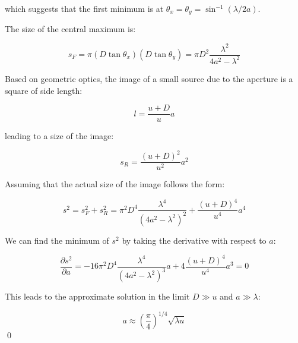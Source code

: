 \documentclass[12pt]{article}
\begin{document}
which suggests that the first minimum is at $\theta_{x} = \theta_{y} = \sin^{-1}{(\lambda/2a)}$.

The size of the central maximum is:

\begin{equation}
    s_{F} = \pi \left( D\tan{\theta_{x}} \right) \left( D\tan{\theta_{y}} \right) = \pi D^{2} \frac{\lambda^{2}}{4a^{2} - \lambda^{2}}
\end{equation}

Based on geometric optics, the image of a small source due to the aperture is a square of side length:

\begin{equation}
    l = \frac{u + D}{u}a
\end{equation}

leading to a size of the image:

\begin{equation}
    s_{R} = \frac{(u + D)^{2}}{u^{2}} a^{2}
\end{equation}

Assuming that the actual size of the image follows the form:

\begin{equation}
    s^{2} = s_{F}^{2} + s_{R}^{2} = \pi^{2} D^{4} \frac{\lambda^{4}}{\left( 4a^{2} - \lambda^{2} \right)^{2}} + \frac{(u + D)^{4}}{u^{4}} a^{4}
\end{equation}

We can find the minimum of $s^{2}$ by taking the derivative with respect to $a$:

\begin{equation}
    \frac{\partial s^{2}}{\partial a} = -16\pi^{2} D^{4} \frac{\lambda^{4}}{\left( 4a^{2} - \lambda^{2} \right)^{3}} a + 4\frac{(u + D)^{4}}{u^{4}} a^{3} = 0
\end{equation}

This leads to the approximate solution in the limit $D \gg u$ and $a \gg \lambda$:

\begin{equation}
    a \approx \left( \frac{\pi}{4} \right)^{1/4} \sqrt{\lambda u}
\end{equation}
\qed
\end{document}

